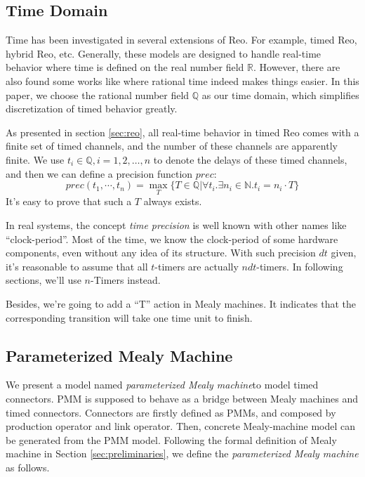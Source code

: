 \documentclass[conference, a4paper]{IEEEtran}
\begin{document}
\subsection{Time Domain}
Time has been investigated in several extensions of Reo. For example, timed
Reo\cite{DBLP:conf/sefm/ArbabBBR04, DBLP:conf/fmoods/MengA07}, hybrid Reo\cite{DBLP:conf/icfem/ChenSS14}, etc.
Generally, these models are designed to handle real-time behavior where time is defined on the
real number field $\mathbb{R}$. However, there are also found some works like
\cite{DBLP:journals/fmsd/PrabhakarDM015} where
rational time indeed  makes things easier. In this paper, we choose the rational number field
$\mathbb{Q}$ as our time domain, which simplifies discretization of timed behavior greatly.

As presented in section \ref{sec:reo}, all real-time behavior in timed Reo comes with a finite set
of timed channels, and the number of these channels are apparently finite. We use
$t_i\in\mathbb{Q}, i=1,2,\dots,n$ to denote the delays of these timed channels, and then we can define a precision
function $prec$:
\[
prec(t_1,\cdots,t_n) = \max_T\{T\in\mathbb{Q}|\forall t_i.\exists n_i\in\mathbb{N}.t_i=n_i\cdot T\}
\]
It's easy to prove that such a $T$ always exists.

In real systems, the concept \emph{time precision} is well known with other names like ``clock-period''.
Most of the time, we know the clock-period of some hardware components, even without any idea of its
structure. With such precision $dt$ given, it's reasonable to assume that all $t$-timers are actually
$ndt$-timers. In following sections, we'll use $n$-Timers instead.

Besides, we're going to add a ``T'' action in Mealy machines. It indicates that the corresponding
transition will take one time unit to finish.

\subsection{Parameterized Mealy Machine}
We present a model named \emph{parameterized Mealy machine}to model timed connectors. PMM is
supposed to behave as a bridge between Mealy machines and timed connectors. Connectors are firstly
defined as PMMs, and composed by production operator and link operator. Then, concrete Mealy-machine
model can be generated from the PMM model.
Following the formal definition of Mealy machine in Section \ref{sec:preliminaries}, we define the
\emph{parameterized Mealy machine} as follows. 
\end{document}
